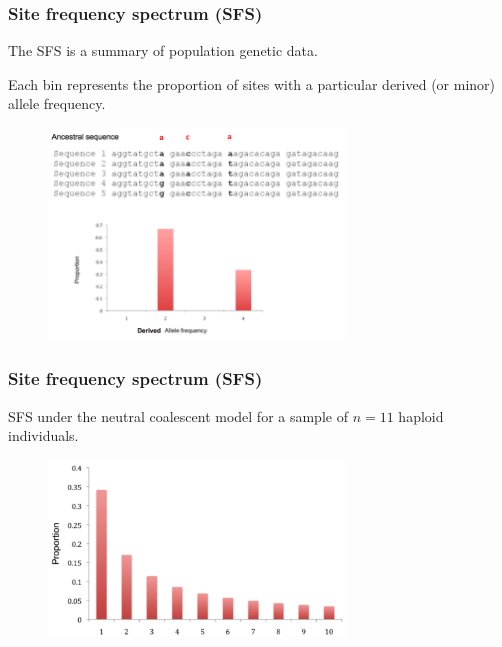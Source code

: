 \begin{frame}
\frametitle{Site frequency spectrum (SFS)}

	The SFS is a summary of population genetic data.

	Each bin represents the proportion of sites with a particular derived (or minor) allele frequency.

	\begin{figure}
                \includegraphics[width=0.7\textwidth]{Pics/sfs_count.png}
        \end{figure}

\end{frame}

\begin{frame}
\frametitle{Site frequency spectrum (SFS)}

	SFS under the neutral coalescent model for a sample of $n=11$ haploid individuals.

	\begin{figure}
                \includegraphics[width=0.7\textwidth]{Pics/sfs_exp.png}
        \end{figure}


\end{frame}

